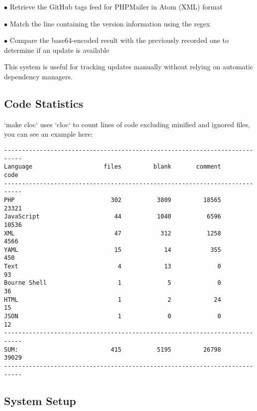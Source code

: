 \documentclass[a4paper]{article}
\begin{document}
\begin{compactitem}
\item[\color{myblue}$\bullet$] Retrieve the GitHub tags feed for PHPMailer in Atom (XML) format
\item[\color{myblue}$\bullet$] Match the line containing the version information using the regex
\item[\color{myblue}$\bullet$] Compare the base64-encoded result with the previously recorded one to determine if an update is available
\end{compactitem}

This system is useful for tracking updates manually without relying on automatic dependency managers.

\hypertarget{toc64}{}
\subsection{Code Statistics}

`make cloc` uses `cloc` to count lines of code excluding minified and ignored files, you can see an example here:

\begin{lstlisting}
---------------------------------------------------------------------------
Language                    files         blank       comment          code
---------------------------------------------------------------------------
PHP                           302          3809         18565         23321
JavaScript                     44          1040          6596         10536
XML                            47           312          1258          4566
YAML                           15            14           355           450
Text                            4            13             0            93
Bourne Shell                    1             5             0            36
HTML                            1             2            24            15
JSON                            1             0             0            12
---------------------------------------------------------------------------
SUM:                          415          5195         26798         39029
---------------------------------------------------------------------------
\end{lstlisting}

\hypertarget{toc65}{}
\subsection{System Setup}
\end{document}
